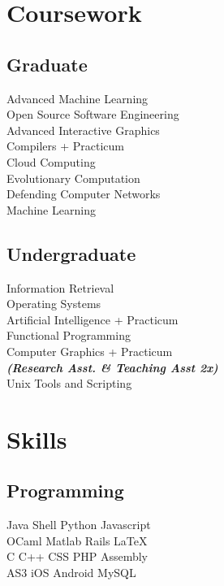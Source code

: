 \documentclass[]{deedy-resume-openfont}
\begin{document}
\begin{minipage}[t]{0.33\textwidth}

\section{Coursework}
\subsection{Graduate}
Advanced Machine Learning \\
Open Source Software Engineering \\
Advanced Interactive Graphics \\
Compilers + Practicum \\
Cloud Computing \\
Evolutionary Computation \\
Defending Computer Networks \\
Machine Learning \\
\sectionsep

\subsection{Undergraduate}
Information Retrieval \\
Operating Systems \\
Artificial Intelligence + Practicum \\
Functional Programming \\
Computer Graphics + Practicum \\
{\footnotesize \textit{\textbf{(Research Asst. \& Teaching Asst 2x) }}} \\
Unix Tools and Scripting \\


\section{Skills}
\subsection{Programming}
Java \textbullet{}   Shell \textbullet{} Python \textbullet{} Javascript \\
OCaml \textbullet{} Matlab \textbullet{} Rails \textbullet{} \LaTeX\ \\ 
C \textbullet{} C++ \textbullet{} CSS \textbullet{} PHP \textbullet{} Assembly \\
AS3 \textbullet{} iOS \textbullet{} Android \textbullet{} MySQL
\sectionsep

%
%

\end{minipage} 
\end{document}
